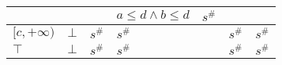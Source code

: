 \documentclass{beamer}
\begin{document}
\begin{frame}
\begin{table}[]
{\begin{tabular}{|l|l|ll|ll|ll|l|}
                                        &                         &                            &                                & $a \le d \land b \le d$ & $s^\#$                   &                            &                                           &                                                 \\ \hline
        $[c, +\infty)$                  & $\bot$                  & \multicolumn{2}{l|}{$s^\#$}                                 & \multicolumn{2}{l|}{$s^\#$}                        & \multicolumn{2}{l|}{$s^\#$}                                            & $s^\#$                                          \\ \hline
        $\top$                          & $\bot$                  & \multicolumn{2}{l|}{$s^\#$}                                 & \multicolumn{2}{l|}{$s^\#$}                        & \multicolumn{2}{l|}{$s^\#$}                                            & $s^\#$                                          \\ \hline
        \end{tabular}}
        \end{table}
    \end{frame}
    
\end{document}
